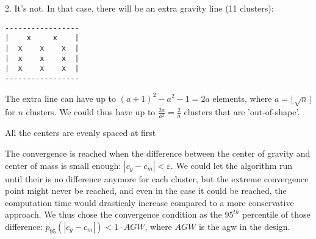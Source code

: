 2. It's not. In that case, there will be an extra gravity line (11 clusters):
\begin{verbatim}
-----------------
|    x     x    |
|  x    x    x  |
|  x    x    x  |
|  x    x    x  |
-----------------
\end{verbatim}
The extra line can have up to $(a+1)^2 - a^2 - 1 = 2a$ elements, where $a = \lfloor \sqrt{n} \rfloor$ for $n$ clusters.
We could thus have up to $\frac{2a}{a^2} = \frac{2}{a}$ clusters that are 'out-of-shape'.

All the centers are evenly spaced at first

The convergence is reached when the difference between the center of gravity and center of mass is small enough: $|c_g - c_m| < \varepsilon$.
We could let the algorithm run until their is no difference anymore for each cluster, but the extreme convergence point might never be reached, and even in the case it could be reached, the computation time would drasticaly increase compared to a more conservative approach.
We thus chose the convergence condition as the $95^{th}$ percentile of those difference: $p_{95}(|c_g - c_m|) < 1 \cdot AGW$, where $AGW$ is the \acrlong{agw} in the design.
